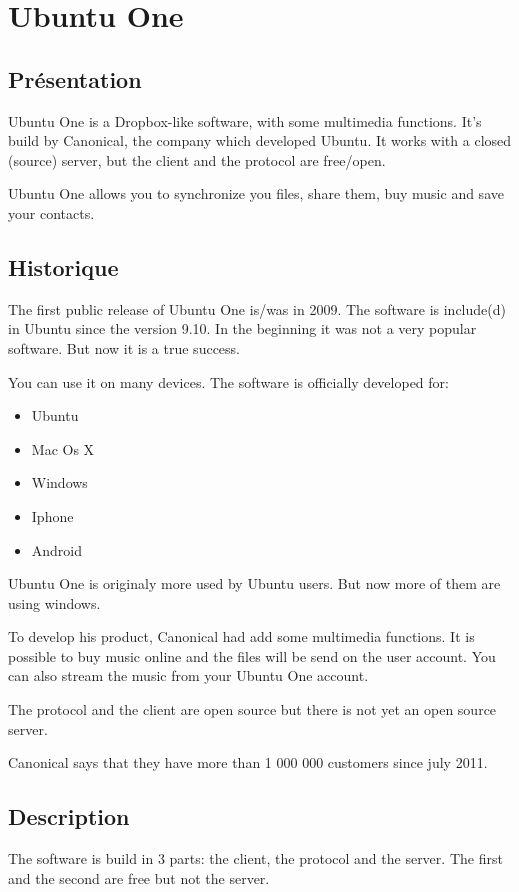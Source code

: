 \section{Ubuntu One}
\thispagestyle{EIP} %
\subsection{Présentation}
Ubuntu One is a Dropbox-like software, with some multimedia functions. It's build by Canonical, the company which developed Ubuntu. It works with a closed (source) server, but the client and the protocol are free/open.

Ubuntu One allows you to synchronize you files, share them, buy music and save your contacts.

\subsection{Historique}
The first public release of Ubuntu One is/was in 2009. The software is include(d) in Ubuntu since the version 9.10. In the beginning it was not a very popular software. But now it is a true success.

You can use it on many devices. The software is officially developed for: 
\begin{itemize}
\renewcommand{\labelitemi}{$\bullet$}
\item Ubuntu
\item Mac Os X
\item Windows
\item Iphone
\item Android
\end{itemize}

Ubuntu One is originaly more used by Ubuntu users. But now more of them are using windows.

To develop his product, Canonical had add some multimedia functions. It is possible to buy music online and the files will be send on the user account. You can also stream the music from your Ubuntu One account.

The protocol and the client are open source but there is not yet an open source server.

Canonical says that they have more than 1 000 000 customers since july 2011.

\subsection{Description}
The software is build in 3 parts: the client, the protocol and the server. The first and the second are free but not the server.

